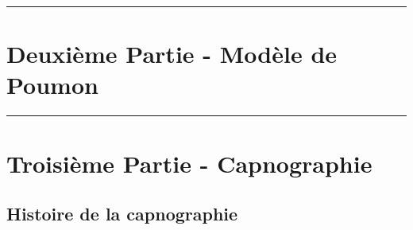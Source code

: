 \documentclass[12pt,]{article}
\begin{document}
\pagebreak

\begin{center}\rule{0.5\linewidth}{\linethickness}\end{center}

\section{Deuxième Partie - Modèle de
Poumon}\label{deuxieme-partie---modele-de-poumon}

\pagebreak

\begin{center}\rule{0.5\linewidth}{\linethickness}\end{center}

\section{Troisième Partie -
Capnographie}\label{troisieme-partie---capnographie}

\subsection{Histoire de la
capnographie}\label{histoire-de-la-capnographie}
\end{document}
